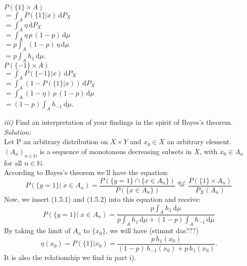\documentclass{article}
\begin{document}
\begin{multicols}{2}
\indent \indent \indent $ P( \{1\} \times A ) $ \vspace*{0.5em} \\
\indent \indent $= \displaystyle{ \int_A P(\{1\} | x )\, \text{d}  P_X }$\vspace*{0.5em}\\
\indent \indent $\displaystyle{= \int_A \eta \, \text{d} P_X }$\vspace*{0.5em}\\
\indent \indent $\displaystyle{= \int_A \eta\, p\, (1-p)\, \text{d} \mu }$\vspace*{0.5em}\\
\indent \indent $\displaystyle{= p\int_A (1-p)\, \eta \, \text{d} \mu }$\vspace*{0.5em}\\
\indent \indent $\displaystyle{= p \int_A h_1\, \text{d} \mu } $.\\
\indent \indent \indent  $ P( \{-1\} \times A ) $\vspace*{0.5em}\\
\indent \indent $= \displaystyle{ \int_A P(\{-1\} | x )\, \text{d}  P_X }$\vspace*{0.5em}\\
\indent \indent $= \displaystyle{ \int_A (1-P(\{1\} | x )  ) \, \text{d} P_X }$\vspace*{0.5em}\\
\indent \indent  $= \displaystyle{ \int_A (1- \eta)\, p\, (1-p)\, \text{d} \mu  } $\vspace*{0.5em}\\
\indent \indent $= \displaystyle{ (1-p)\int_A h_{-1} \, \text{d} \mu   }$.\\
\end{multicols}

\noindent\textsl{iii)} Find an interpretation of your findings in the spirit of Bayes's theorem. \\
\textsl{Solution:}\\
Let P an arbitrary distribution on $X \times Y$ and  $x_0 \in X$ an arbitrary element.\\ 
$(A_n)_{n \in \mathbb{N}}$ is a sequence of monotonous decreasing subsets in $X$, with $x_0 \in A_n$ for all $n \in \mathbb{N}$.\\ 
According to Bayes's theorem we'll have the equation: \[P(\{y=1\} |\; x \in A_n ) = \frac{P( \{ y = 1\} \cap \{x \in A_n \})}{P(\{x \in A_n\})} \overset{def.}{=} \frac{P(\{1\} \times A_n)}{P_X(A_n)} \]
Now, we insert (1.5.1) and (1.5.2) into this equation and receive:
\[P(\{y=1\} |\; x \in A_n ) = \frac{ p \displaystyle{\int_A h_{1} \, \text{d}\mu }}{p \displaystyle{\int_A h_{1} \, \text{d}\mu + (1-p)\displaystyle{\int_A h_{-1} \, \text{d}\mu }}} \] 
By taking the limit of $A_n$ to $\{x_0\}$, we will have (stimmt das???)
\[\eta(x_0)=P(\{1\}|x_0) = \frac{p \, h_1(x_0)}{(1-p)\,h_{-1}(x_0) + p\, h_1(x_0)}.\]
It is also the relationship we find in part i).
\end{document}
